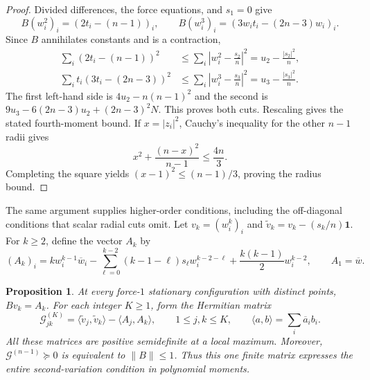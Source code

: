 \documentclass[11pt]{article}
\newtheorem{proposition}[theorem]{Proposition}
\theoremstyle{remark}
\numberwithin{equation}{section}
\begin{document}
\begin{proof}
Divided differences, the force equations, and $s_1=0$ give
\[
 B(w_i^2)_i=(2t_i-(n-1))_i,
 \qquad
 B(w_i^3)_i=(3w_it_i-(2n-3)w_i)_i.
\]
Since $B$ annihilates constants and is a contraction,
\begin{align*}
 \sum_i(2t_i-(n-1))^2
 &\le\sum_i\left|w_i^2-\frac{s_2}{n}\right|^2
 =u_2-\frac{|s_2|^2}{n},\\
 \sum_it_i(3t_i-(2n-3))^2
 &\le\sum_i\left|w_i^3-\frac{s_3}{n}\right|^2
 =u_3-\frac{|s_3|^2}{n}.
\end{align*}
The first left-hand side is $4u_2-n(n-1)^2$ and the second is
$9u_3-6(2n-3)u_2+(2n-3)^2N$.  This proves both cuts.
Rescaling gives the stated fourth-moment bound.  If $x=|z_i|^2$,
Cauchy's inequality for the other $n-1$ radii gives
\[
 x^2+\frac{(n-x)^2}{n-1}\le\frac{4n}{3}.
\]
Completing the square yields $(x-1)^2\le(n-1)/3$, proving the
radius bound.
\end{proof}

The same argument supplies higher-order conditions, including the
off-diagonal conditions that scalar radial cuts omit.  Let
$v_k=(w_i^k)_i$ and $\widetilde v_k=v_k-(s_k/n)\mathbf1$.
For $k\ge2$, define the vector $A_k$ by
\begin{equation}\label{eq:power-stability-action}
 (A_k)_i=
 k w_i^{k-1}\overline w_i
 -\sum_{\ell=0}^{k-2}(k-1-\ell)s_\ell w_i^{k-2-\ell}
 +\frac{k(k-1)}2w_i^{k-2},
 \qquad A_1=\overline w.
\end{equation}

\begin{proposition}\label{prop:finite-power-stability}
At every force-$1$ stationary configuration with distinct points,
$Bv_k=A_k$.  For each integer $K\ge1$, form the Hermitian matrix
\[
 \mathcal G^{(K)}_{jk}
 =\langle\widetilde v_j,\widetilde v_k\rangle
  -\langle A_j,A_k\rangle,
 \qquad 1\le j,k\le K,
 \qquad \langle a,b\rangle=\sum_i\overline a_i b_i.
\]
All these matrices are positive semidefinite at a local maximum.
Moreover, $\mathcal G^{(n-1)}\succeq0$ is equivalent to
$\|B\|\le1$.  Thus this one finite matrix expresses the entire
second-variation condition in polynomial moments.
\end{proposition}
\end{document}
